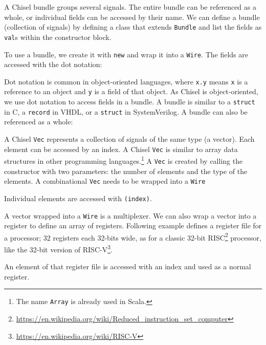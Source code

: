 \documentclass[%
    10pt,
    headinclude, footexclude,
    openright, %
    notitlepage,
    cleardoubleempty,
    headsepline,
    pointlessnumbers,
    bibtotoc, idxtotoc,
    ]{scrbook}
\newcommand{\code}[1]{{\small{\texttt{#1}}}}
\newcommand{\codefoot}[1]{{\footnotesize{\texttt{#1}}}}
\newcommand{\myref}[2]{\href{#1}{#2}}
\renewcommand{\myref}[2]{{#2}{\footnote{\url{#1}}}}
\begin{document}
A Chisel bundle groups several signals. The entire bundle can be referenced
as a whole, or individual fields can be accessed by their name.
We can define a bundle (collection of signals) by defining a class that
extends \code{Bundle} and list the fields as \code{val}s within the constructor block.


\noindent To use a bundle, we create it with \code{new} and wrap it into a \code{Wire}.
The fields are accessed with the dot notation:


Dot notation is common in object-oriented languages, where \code{x.y} means
\code{x} is a reference to an object and \code{y} is a field of that object.
As Chisel is object-oriented, we use dot notation to access fields in a bundle.
A bundle is similar to a \code{struct} in C, a \code{record} in VHDL, or a
\code{struct} in SystemVerilog.
A bundle can also be referenced as a whole:


A Chisel \code{Vec} represents a collection of signals of the same type (a vector).
Each element can be accessed by an index. A Chisel \code{Vec} is similar
to array data structures in other programming languages.\footnote{The name \codefoot{Array}
is already used in Scala.}
A \code{Vec} is created by calling the constructor with two parameters: the
number of elements and the type of the elements. A combinational \code{Vec}
needs to be wrapped into a \code{Wire}


\noindent Individual elements are accessed with \code{(index)}.


A vector wrapped into a \code{Wire} is a multiplexer.
We can also wrap a vector into a register to define an array of registers.
Following example defines a register file for a processor; 32 registers
each 32-bits wide, as for a classic 32-bit 
\myref{https://en.wikipedia.org/wiki/Reduced_instruction_set_computer}{RISC}
processor, like the 32-bit version of \myref{https://en.wikipedia.org/wiki/RISC-V}{RISC-V}.


\noindent An element of that register file is accessed with an index and used as a normal register.

\end{document}
